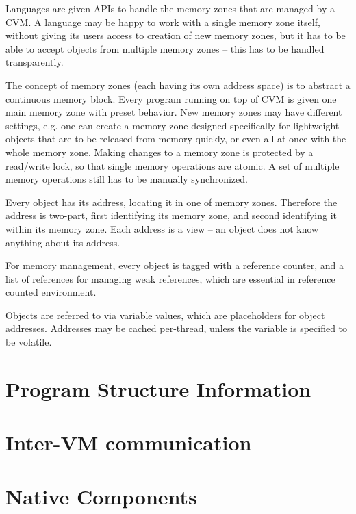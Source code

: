 Languages are given APIs to handle the memory zones that are managed by a CVM. A language may be happy to work with a single memory zone itself, without giving its users access to creation of new memory zones, but it has to be able to accept objects from multiple memory zones -- this has to be handled transparently. 

The concept of memory zones (each having its own address space) is to abstract a continuous memory block. Every program running on top of CVM is given one main memory zone with preset behavior. New memory zones may have different settings, e.g. one can create a memory zone designed specifically for lightweight objects that are to be released from memory quickly, or even all at once with the whole memory zone. Making changes to a memory zone is protected by a read/write lock, so that single memory operations are atomic. A set of multiple memory operations still has to be manually synchronized. 

Every object has its address, locating it in one of memory zones. Therefore the address is two-part, first identifying its memory zone, and second identifying it within its memory zone. Each address is a view -- an object does not know anything about its address. 

For memory management, every object is tagged with a reference counter, and a list of references for managing weak references, which are essential in reference counted environment. 

Objects are referred to via variable values, which are placeholders for object addresses. Addresses may be cached per-thread, unless the variable is specified to be volatile. 






\section{Program Structure Information}

\section{Inter-VM communication} %

\section{Native Components} %


